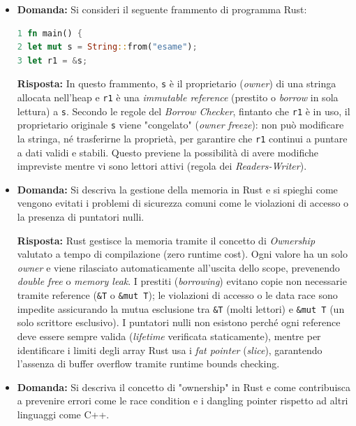 \begin{itemize}
    \item \begin{exambox}
    \textbf{Domanda:} Si consideri il seguente frammento di programma Rust:
\begin{lstlisting}[language=Rust]
1 fn main() {
2 let mut s = String::from("esame");
3 let r1 = &s;
\end{lstlisting}

    \textbf{Risposta:} In questo frammento, \texttt{s} è il proprietario (\emph{owner}) di una stringa allocata nell'heap e \texttt{r1} è una \emph{immutable reference} (prestito o \emph{borrow} in sola lettura) a \texttt{s}. Secondo le regole del \emph{Borrow Checker}, fintanto che \texttt{r1} è in uso, il proprietario originale \texttt{s} viene "congelato" (\emph{owner freeze}): non può modificare la stringa, né trasferirne la proprietà, per garantire che \texttt{r1} continui a puntare a dati validi e stabili. Questo previene la possibilità di avere modifiche impreviste mentre vi sono lettori attivi (regola dei \emph{Readers-Writer}).
    \end{exambox}

    \item \begin{exambox}
    \textbf{Domanda:} Si descriva la gestione della memoria in Rust e si spieghi come vengono evitati i problemi di sicurezza comuni come le violazioni di accesso o la presenza di puntatori nulli.
    
    \textbf{Risposta:} Rust gestisce la memoria tramite il concetto di \emph{Ownership} valutato a tempo di compilazione (zero runtime cost). Ogni valore ha un solo \emph{owner} e viene rilasciato automaticamente all'uscita dello scope, prevenendo \emph{double free} o \emph{memory leak}. I prestiti (\emph{borrowing}) evitano copie non necessarie tramite reference (\texttt{\&T} o \texttt{\&mut T}); le violazioni di accesso o le data race sono impedite assicurando la mutua esclusione tra \texttt{\&T} (molti lettori) e \texttt{\&mut T} (un solo scrittore esclusivo). I puntatori nulli non esistono perché ogni reference deve essere sempre valida (\emph{lifetime} verificata staticamente), mentre per identificare i limiti degli array Rust usa i \emph{fat pointer} (\emph{slice}), garantendo l'assenza di buffer overflow tramite runtime bounds checking.
    \end{exambox}

    \item \begin{exambox}
    \textbf{Domanda:} Si descriva il concetto di "ownership" in Rust e come contribuisca a prevenire errori come le race condition e i dangling pointer rispetto ad altri linguaggi come C++.
    

\end{exambox}
\end{itemize}
